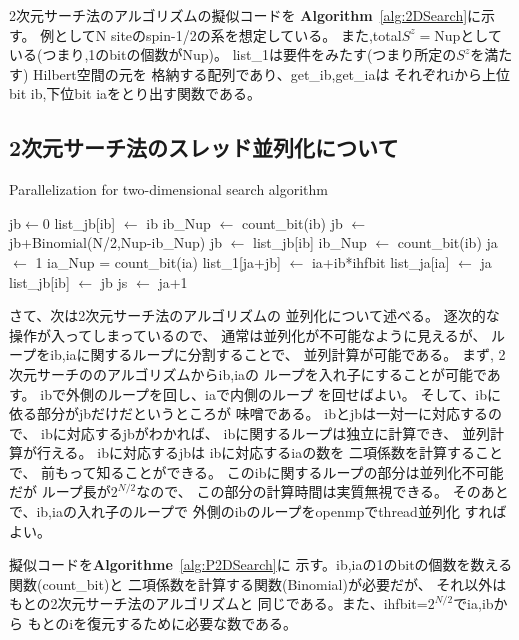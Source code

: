 \documentclass[prb,aps,showpacs,preprint,nofootinbib]{revtex4}
\newcommand{\lef}{\leftarrow}
\begin{document}
2次元サーチ法のアルゴリズムの擬似コードを
{\bf Algorithm}~\ref{alg:2DSearch}に示す。
例としてN siteのspin-1/2の系を想定している。
また,total$S^z=$Nupとしている(つまり,1のbitの個数がNup)。
list\_1は要件をみたす(つまり所定の$S^{z}$を満たす)
Hilbert空間の元を
格納する配列であり、get\_ib,get\_iaは
それぞれiから上位bit ib,下位bit iaをとり出す関数である。

\newpage
\subsection{2次元サーチ法のスレッド並列化について}
\label{sec:thread}

\begin{algorithm}                      
\caption{Parallelization for two-dimensional search algorithm}         
\label{alg1}                          
\begin{algorithmic}                  
\STATE jb$\lef 0$
  \STATE list\_jb[ib] $\lef$ ib
  \STATE ib\_Nup $\lef$ count\_bit(ib)
  \STATE jb $\lef$ jb+Binomial(N/2,Nup-ib\_Nup)
\ENDFOR
{}
  \STATE jb $\lef$ list\_jb[ib]
  \STATE ib\_Nup $\lef$ count\_bit(ib)
  \STATE ja $\lef$ 1 
    \STATE ia\_Nup = count\_bit(ia)
      \STATE list\_1[ja+jb] $\lef$ ia+ib*ihfbit
      \STATE list\_ja[ia] $\lef$ ja
      \STATE list\_jb[ib] $\lef$ jb
      \STATE js $\lef$ ja+1
    \ENDIF
  \ENDFOR
\ENDFOR
\end{algorithmic}
\label{alg:P2DSearch}
\end{algorithm}

さて、次は2次元サーチ法のアルゴリズムの
並列化について述べる。
逐次的な操作が入ってしまっているので、
通常は並列化が不可能なように見えるが、
ループをib,iaに関するループに分割することで、
並列計算が可能である。
まず, 2次元サーチののアルゴリズムからib,iaの
ループを入れ子にすることが可能であす。
ibで外側のループを回し、iaで内側のループ
を回せばよい。
そして、ibに依る部分がjbだけだというところが
味噌である。
ibとjbは一対一に対応するので、
ibに対応するjbがわかれば、
ibに関するループは独立に計算でき、
並列計算が行える。
ibに対応するjbは
ibに対応するiaの数を
二項係数を計算することで、
前もって知ることができる。
このibに関するループの部分は並列化不可能だが
ループ長が$2^{N/2}$なので、
この部分の計算時間は実質無視できる。
そのあとで、ib,iaの入れ子のループで
外側のibのループをopenmpでthread並列化
すればよい。

擬似コードを{\bf Algorithme}~\ref{alg:P2DSearch}に
示す。ib,iaの1のbitの個数を数える関数(count\_bit)と
二項係数を計算する関数(Binomial)が必要だが、
それ以外はもとの2次元サーチ法のアルゴリズムと
同じである。また、ihfbit=$2^{N/2}$でia,ibから
もとのiを復元するために必要な数である。
\end{document}
